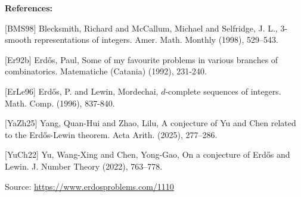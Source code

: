 \documentclass{article}
\begin{document}
\bigskip
\noindent\textbf{References:}

[BMS98] Blecksmith, Richard and McCallum, Michael and Selfridge, J.
L., {$3$}-smooth representations of integers. Amer. Math. Monthly (1998), 529--543.
 
 [Er92b] Erd\H{o}s, Paul, Some of my favourite problems in various branches of combinatorics. Matematiche (Catania) (1992), 231-240.
 
 [ErLe96] Erd\H{o}s, P. and Lewin, Mordechai, $d$-complete sequences of integers. Math. Comp. (1996), 837-840.
 
 [YaZh25] Yang, Quan-Hui and Zhao, Lilu, A conjecture of {Y}u and {C}hen related to the {E}rd\H
os-{L}ewin theorem. Acta Arith. (2025), 277--286.
 
 [YuCh22] Yu, Wang-Xing and Chen, Yong-Gao, On a conjecture of {E}rd\H{o}s and {L}ewin. J. Number Theory (2022), 763--778.

\bigskip
\noindent\small{Source: \url{https://www.erdosproblems.com/1110}}
\end{document}
